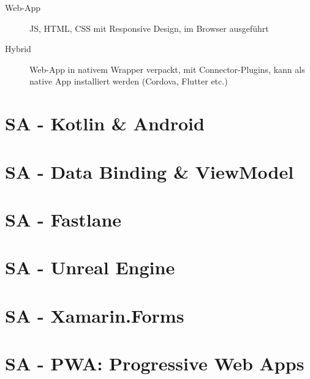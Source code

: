 \documentclass[a4paper]{article}
\begin{document}
		\begin{description}
			\item[Web-App] JS, HTML, CSS mit Responsive Design, im Browser ausgeführt
			\item[Hybrid] Web-App in nativem Wrapper verpackt, mit Connector-Plugins, kann als native App installiert werden (Cordova, Flutter etc.)
		\end{description}
		
	\section{SA - Kotlin \& Android}
	
	
	
	\section{SA - Data Binding \& ViewModel}
	
	
	
	\section{SA - Fastlane}
	
	
	
	\section{SA - Unreal Engine}
	
	
	
	\section{SA - Xamarin.Forms}
	
	
	
	\section{SA - PWA: Progressive Web Apps}
	
\end{document}
